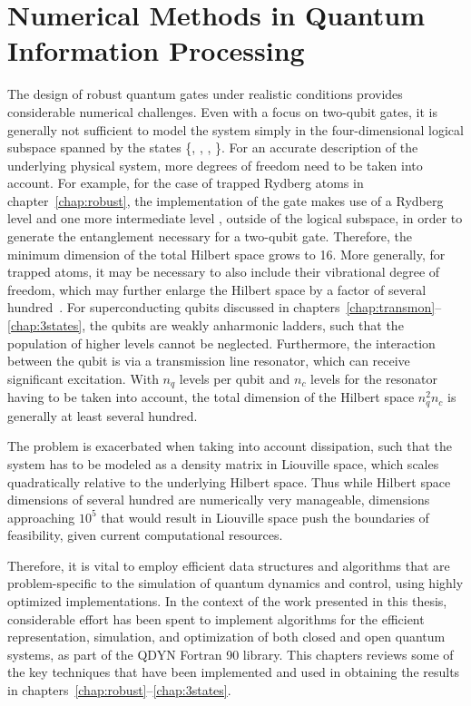 \chapter{Numerical Methods in Quantum Information Processing}
\label{chap:numerics}

The  design of robust quantum gates under realistic conditions provides
considerable numerical challenges.
Even with a focus on two-qubit gates, it is generally not sufficient to model
the system simply in the four-dimensional logical subspace spanned by the states
\{, , , \}. For an accurate description of the
underlying physical system, more degrees of freedom need to be taken
into account. For example, for the case of trapped Rydberg atoms in
chapter~\ref{chap:robust}, the implementation of the gate makes use of a Rydberg
level  and one more intermediate level , outside of the logical
subspace, in order to generate the entanglement necessary for a two-qubit gate.
Therefore, the minimum dimension of the total Hilbert space grows to 16. More
generally, for trapped atoms, it may be necessary to also include
their vibrational degree of freedom, which may further enlarge the Hilbert space
by a factor of several hundred~\cite{GoerzJPB11, GoerzDipl10}. For
superconducting qubits discussed in
chapters~\ref{chap:transmon}--\ref{chap:3states}, the qubits are weakly
anharmonic ladders, such that the population of higher levels cannot be
neglected. Furthermore, the interaction between the qubit is via a transmission
line resonator, which can receive significant excitation. With $n_q$ levels per
qubit and $n_c$ levels for the resonator having to be taken into account, the
total dimension of the Hilbert space $n_q^2 n_c$ is generally at least several
hundred.

The problem is exacerbated when taking into account dissipation, such that the
system has to be modeled as a density matrix in Liouville space, which scales
quadratically relative to the underlying Hilbert space. Thus while Hilbert space
dimensions of several hundred are numerically very manageable, dimensions
approaching $10^5$ that would result in Liouville space push the boundaries of
feasibility, given current computational resources.

Therefore, it is vital to employ efficient data structures and algorithms that
are problem-specific to the simulation of quantum dynamics and control, using
highly optimized implementations.
In the context of the work presented in this thesis, considerable effort has
been spent to implement algorithms for the efficient representation, simulation,
and optimization of both closed and open quantum systems, as part of the QDYN
Fortran 90 library. This chapters reviews some of the key techniques that have
been implemented and used in obtaining the results in
chapters~\ref{chap:robust}--\ref{chap:3states}.


